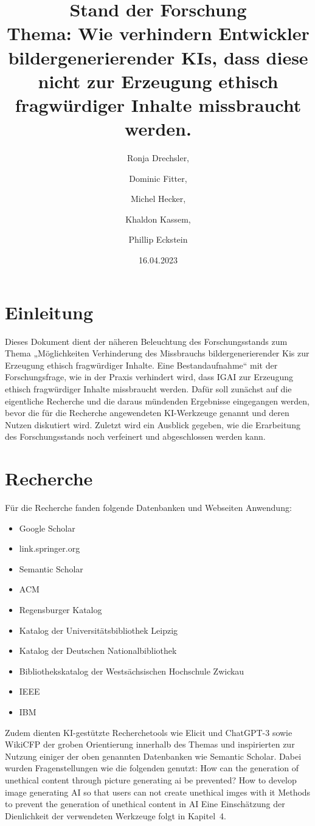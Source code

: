 \documentclass[12pt]{article}
\title{Stand der Forschung \\[1ex] \large Thema: Wie verhindern Entwickler bildergenerierender KIs, dass diese nicht zur Erzeugung ethisch fragwürdiger Inhalte missbraucht werden.}
\date{16.04.2023}
\author{Ronja Drechsler, \and Dominic Fitter, \and Michel Hecker, \and Khaldon Kassem, \and Phillip Eckstein}
\begin{document}
\maketitle
\section{Einleitung}
Dieses Dokument dient der näheren Beleuchtung des Forschungsstands zum Thema  „Möglichkeiten Verhinderung des Missbrauchs bildergenerierender Kis zur Erzeugung ethisch fragwürdiger Inhalte. Eine Bestandaufnahme“ mit der Forschungsfrage, wie in der Praxis verhindert wird, dass IGAI zur Erzeugung ethisch fragwürdiger Inhalte missbraucht werden. Dafür soll zunächst auf die eigentliche Recherche und die daraus mündenden Ergebnisse eingegangen werden, bevor die für die Recherche angewendeten KI-Werkzeuge genannt und deren Nutzen diskutiert wird. Zuletzt wird ein Ausblick gegeben, wie die Erarbeitung des Forschungsstands noch verfeinert und abgeschlossen werden kann.
\section{Recherche}
Für die Recherche fanden folgende Datenbanken und Webseiten Anwendung:
\begin{itemize}
    \item Google Scholar
    \item link.springer.org
    \item Semantic Scholar
    \item ACM
    \item Regensburger Katalog
    \item Katalog der Universitätsbibliothek Leipzig
    \item Katalog der Deutschen Nationalbibliothek
    \item Bibliothekskatalog der Westsächsischen Hochschule Zwickau
    \item IEEE
    \item IBM    
\end{itemize}

Zudem dienten KI-gestützte Recherchetools wie Elicit und ChatGPT-3 sowie WikiCFP der groben Orientierung innerhalb des Themas und inspirierten zur Nutzung einiger der oben genannten Datenbanken wie Semantic Scholar. Dabei wurden Fragenstellungen wie die folgenden genutzt:
How can the generation of unethical content through picture generating ai be prevented?
How to develop image generating AI so that users can not create unethical imges with it
Methods to prevent the generation of unethical content in AI
Eine Einschätzung der Dienlichkeit der verwendeten Werkzeuge folgt in Kapitel 4.
\end{document}
